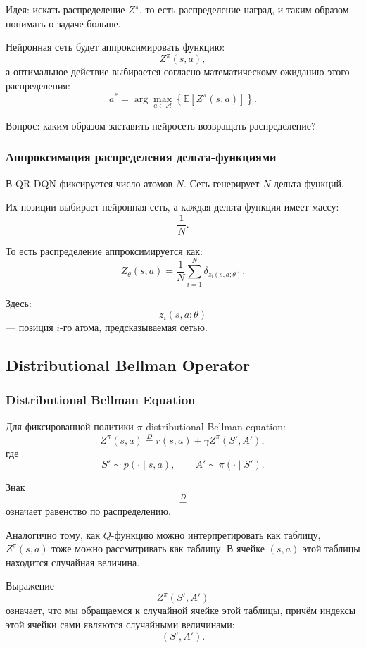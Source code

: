 \documentclass[12pt,a4paper]{article}
\begin{document}
Идея: искать распределение $Z^\pi$, то есть распределение наград, и таким образом понимать о задаче больше.

Нейронная сеть будет аппроксимировать функцию:
\[
Z^\pi(s,a),
\]
а оптимальное действие выбирается согласно математическому ожиданию этого распределения:
\[
a^\ast
=
\arg\max_{a \in \mathcal A}
\left\{
\mathbb E
\left[
Z^\pi(s,a)
\right]
\right\}.
\]

Вопрос: каким образом заставить нейросеть возвращать распределение?

\subsubsection{Аппроксимация распределения дельта-функциями}

В QR-DQN фиксируется число атомов $N$. Сеть генерирует $N$ дельта-функций.

Их позиции выбирает нейронная сеть, а каждая дельта-функция имеет массу:
\[
\frac{1}{N}.
\]

То есть распределение аппроксимируется как:
\[
Z_\theta(s,a)
=
\frac{1}{N}
\sum_{i=1}^{N}
\delta_{z_i(s,a;\theta)}.
\]

Здесь:
\[
z_i(s,a;\theta)
\]
--- позиция $i$-го атома, предсказываемая сетью.

\subsection{Distributional Bellman Operator}

\subsubsection{Distributional Bellman Equation}

Для фиксированной политики $\pi$ distributional Bellman equation:
\[
Z^\pi(s,a)
\overset{D}{=}
r(s,a)
+
\gamma Z^\pi(S',A'),
\]
где
\[
S' \sim p(\cdot\mid s,a),
\qquad
A' \sim \pi(\cdot\mid S').
\]

Знак
\[
\overset{D}{=}
\]
означает равенство по распределению.

Аналогично тому, как $Q$-функцию можно интерпретировать как таблицу, $Z^\pi(s,a)$ тоже можно рассматривать как таблицу. В ячейке $(s,a)$ этой таблицы находится случайная величина.

Выражение
\[
Z^\pi(S',A')
\]
означает, что мы обращаемся к случайной ячейке этой таблицы, причём индексы этой ячейки сами являются случайными величинами:
\[
(S',A').
\]
\end{document}
